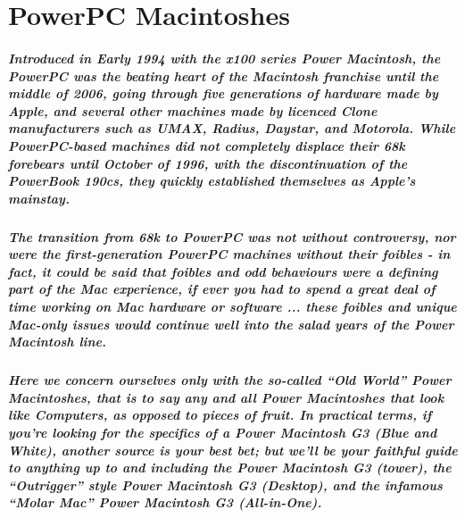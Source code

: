 
\chapter{PowerPC Macintoshes}

\paragraph{%
Introduced in Early 1994 with the x100 series Power Macintosh, the PowerPC was %
the beating heart of the Macintosh franchise until the middle of 2006, going %
through five generations of hardware made by Apple, and several other machines %
made by licenced Clone manufacturers such as UMAX, Radius, Daystar, and %
Motorola. While PowerPC-based machines did not completely displace their 68k %
forebears until October of 1996, with the discontinuation of the PowerBook 190cs, %
they quickly established themselves as Apple's mainstay. %
}

\paragraph{%
The transition from 68k to PowerPC was not without controversy, nor were the %
first-generation PowerPC machines without their foibles - in fact, it could be %
said that foibles and odd behaviours were a defining part of the Mac experience, %
if ever you had to spend a great deal of time working on Mac hardware or software%
... %
these foibles and unique Mac-only issues would continue well into the salad years %
of the Power Macintosh line. %
}

\paragraph{%
Here we concern ourselves only with the so-called ``Old World'' Power Macintoshes, %
that is to say any and all Power Macintoshes that look like Computers, as opposed %
to pieces of fruit. In practical terms, if you're looking for the specifics of a %
Power Macintosh G3 (Blue and White), another source is your best bet; but we'll %
be your faithful guide to anything up to and including the Power Macintosh G3 %
(tower), the ``Outrigger'' style Power Macintosh G3 (Desktop), and the infamous %
``Molar Mac'' Power Macintosh G3 (All-in-One). %
}
